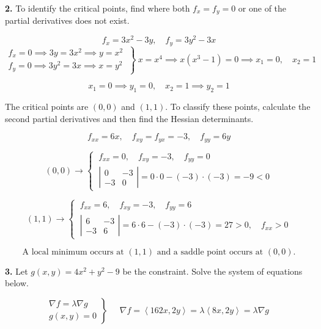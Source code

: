 \documentclass{article}
\begin{document}
\textbf{2.} To identify the critical points, find where both $f_x=f_y=0$ or one of the partial derivatives does not exist.

\[f_x=3x^2-3y,\quad f_y=3y^2-3x\]
\[\left.\begin{array}{c}
f_x=0\implies 3y=3x^2\implies y=x^2\\
f_y=0\implies 3y^2=3x\implies x=y^2 
\end{array}\:\right\}\: x=x^4\implies x(x^3-1)=0\implies x_1=0,\quad x_2=1\]

\[x_1=0\implies y_1=0,\quad x_2=1\implies y_2=1\]

The critical points are $(0,0)$ and $(1,1)$. To classify these points, calculate the second partial derivatives and then find the Hessian determinants.

\[f_{xx}=6x,\quad f_{xy}=f_{yx}=-3,\quad f_{yy}=6y\]

\[(0,0)\rightarrow\left\{\:\begin{array}{l}
f_{xx}=0,\quad f_{xy}=-3,\quad f_{yy}=0\\[1em]
\left|\begin{array}{cc}
0 & -3\\
-3 & 0
\end{array}\right|=0\cdot0-(-3)\cdot(-3)=-9<0
\end{array}\right.\]

\[(1,1)\rightarrow\left\{\:\begin{array}{l}
f_{xx}=6,\quad f_{xy}=-3,\quad f_{yy}=6\\[1em]
\left|\begin{array}{cc}
6 & -3\\
-3 & 6
\end{array}\right|=6\cdot6-(-3)\cdot (-3)=27>0,\quad f_{xx}>0
\end{array}\right.\]

\[\boxed{\text{A local minimum occurs at }(1,1)\text{ and a saddle point occurs at }(0,0).}\]

\newpage

\textbf{3.} Let $g(x,y)=4x^2+y^2-9$ be the constraint. Solve the system of equations below.

\[
\left.
\begin{array}{c}
\displaystyle\nabla f=\lambda\nabla g\\
\displaystyle g(x,y)=0
\end{array}
\right\}\quad
\begin{array}{l}
\nabla f=\left\langle162x,2y\right\rangle=\lambda\left\langle8x,2y\right\rangle=\lambda\nabla g
\end{array}
\]
\end{document}
